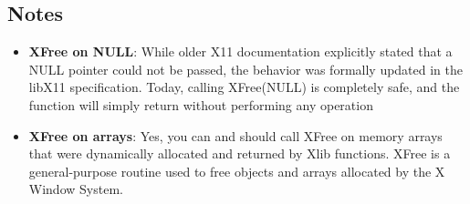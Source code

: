\documentclass{report}
\begin{document}
    \subsection{Notes}
    \begin{itemize}
        \item \textbf{XFree on NULL}:  While older X11 documentation explicitly stated that a NULL pointer could not be passed, the behavior was formally updated in the libX11 specification. Today, calling XFree(NULL) is completely safe, and the function will simply return without performing any operation
        \item \textbf{XFree on arrays}: Yes, you can and should call XFree on memory arrays that were dynamically allocated and returned by Xlib functions. XFree is a general-purpose routine used to free objects and arrays allocated by the X Window System.

    \end{itemize}















    
\end{document}
